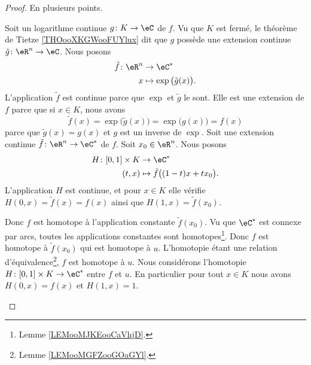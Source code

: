 \begin{proof}
    En plusieurs points.
    \begin{subproof}
        \spitem[\ref{ITEMooKZYDooKoEEbl} \( \Rightarrow\) \ref{ITEMooQDHXooObjxLA}]
        Soit un logarithme continue \( g\colon K\to \eC\) de \( f\). Vu que \( K\) est fermé, le théorème de Tietze \ref{THOooXKGWooFUYlux} dit que \( g\) possède une extension continue \( \tilde g\colon \eR^n\to \eC\). Nous posons
        \begin{equation}
            \begin{aligned}
                \tilde f\colon \eR^n&\to \eC^* \\
                x&\mapsto \exp\big( \tilde g(x) \big). 
            \end{aligned}
        \end{equation}
        L'application \( \tilde f\) est continue parce que \( \exp\) et \( \tilde g\) le sont. Elle est une extension de \( f\) parce que si \( x\in K\), nous avons
        \begin{equation}
            \tilde f(x)=\exp\big( \tilde g(x) \big)=\exp\big( g(x) \big)=f(x)
        \end{equation}
        parce que \( \tilde g(x)=g(x)\) et \( g\) est un inverse de \( \exp\).
        \spitem[\ref{ITEMooQDHXooObjxLA} \( \Rightarrow\) \ref{ITEMooXVNXooVAHklr}]
        Soit une extension continue \( \tilde f\colon \eR^n\to \eC^*\) de \( f\). Soit \( x_0\in \eR^n\). Nous posons
        \begin{equation}
            \begin{aligned}
                H\colon \mathopen[ 0 , 1 \mathclose]\times K&\to \eC^* \\
                (t,x)&\mapsto \tilde f\big( (1-t)x+tx_0 \big). 
            \end{aligned}
        \end{equation}
        L'application \( H\) est continue, et pour \( x\in K\) elle vérifie \( H(0,x)=\tilde f(x)=f(x)\) ainsi que \( H(1,x)=\tilde f(x_0)\).

        Donc \( f\) est homotope à l'application constante \( \tilde f(x_0)\). Vu que \( \eC^*\) est connexe par arcs, toutes les applications constantes sont homotopes\footnote{Lemme \ref{LEMooMJKEooCaVhjD}.}. Donc \( f\) est homotope à \( \tilde f(x_0)\) qui est homotope à \( u\). L'homotopie étant une relation d'équivalence\footnote{Lemme \ref{LEMooMGFZooGOaGYl}.}, \( f\) est homotope à \( u\).
        \spitem[\ref{ITEMooXVNXooVAHklr} \( \Rightarrow\) \ref{ITEMooKZYDooKoEEbl}]
        Nous considérons l'homotopie \( H\colon \mathopen[ 0 , 1 \mathclose]\times K\to \eC^*\) entre \( f\) et \( u\). En particulier pour tout \( x\in K\) nous avons \( H(0,x)=f(x)\) et \( H(1,x)=1\).


\end{subproof}
\end{proof}
